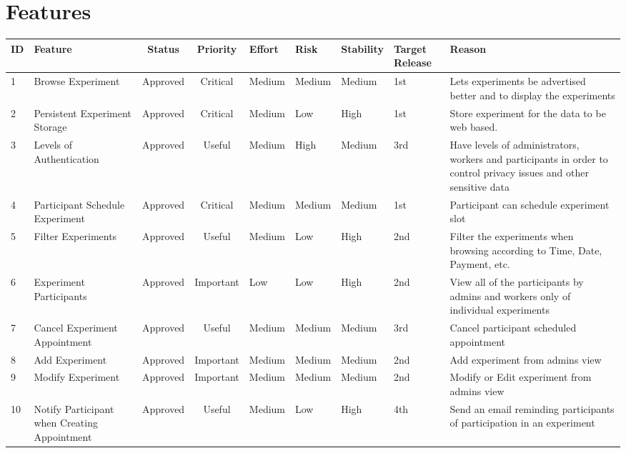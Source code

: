 \clearpage
\section{Features}
\begin{table}[!h]\footnotesize
    \begin{tabular}{|p{.5cm}|p{2.5cm}|c|c|p{1.25cm}|p{1cm}|p{1.25cm}|p{1cm}|p{3.75cm}|}
        \hline
         ID & Feature & Status & Priority & Effort & Risk & Stability & Target Release & Reason \\
        \hline
        1 & Browse Experiment & Approved & Critical & Medium & Medium & Medium & 1st & Lets experiments be advertised better and to display the experiments \\
        \hline
        2 & Persistent Experiment Storage & Approved & Critical & Medium & Low & High & 1st & Store experiment for the data to be web based. \\
        \hline
        3 & Levels of Authentication & Approved & Useful & Medium & High & Medium & 3rd & Have levels of administrators, workers and participants in order to control privacy issues and other sensitive data \\
        \hline
        4 & Participant Schedule Experiment & Approved & Critical & Medium & Medium & Medium & 1st & Participant can schedule experiment slot \\
        \hline
        5 & Filter Experiments & Approved & Useful & Medium & Low & High & 2nd & Filter the experiments when browsing according to Time, Date, Payment, etc. \\
        \hline
        6 & Experiment Participants & Approved & Important & Low & Low & High & 2nd & View all of the participants by admins and workers only of individual experiments \\
        \hline
        7 & Cancel Experiment Appointment & Approved & Useful & Medium & Medium & Medium & 3rd & Cancel participant scheduled appointment \\
        \hline
        8 & Add Experiment & Approved & Important & Medium & Medium & Medium & 2nd & Add experiment from admins view \\
        \hline
        9 & Modify Experiment & Approved & Important & Medium & Medium & Medium & 2nd & Modify or Edit experiment from admins view \\
        \hline
        10 & Notify Participant when Creating Appointment & Approved & Useful & Medium & Low & High & 4th & Send an email reminding participants of participation in an experiment \\

\end{tabular}
\end{table}
